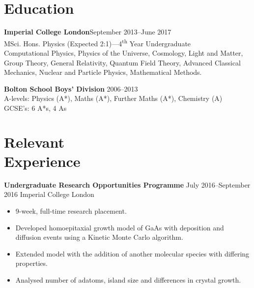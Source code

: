 \documentclass[12pt, margin]{res}
\begin{document}
 

 
\address{{\bf Present Address} \\ 119 Latymer Court \\ Hammersmith Road \\ London, W6 7JF}
\address{{\bf Permanent Address} \\ 174 Crompton Way \\ Bolton, BL2 2SA \\}

 
\begin{resume} 
 

\section{Education}
{\bf Imperial College London}\hfill September 2013--June 2017\\
MSci. Hons. Physics (Expected 2:1)---4\textsuperscript{th} Year Undergraduate\\
Computational Physics, Physics of the Universe, Cosmology, Light and Matter,  Group Theory, General Relativity, Quantum Field Theory, Advanced Classical Mechanics, Nuclear and Particle Physics, Mathematical Methods.

{\bf Bolton School Boys' Division} \hfill 2006--2013 \\
A-levels: Physics (A*), Maths (A*), Further Maths (A*), Chemistry (A)\\
GCSE's: 6 A*s, 4 As
 

\section{Relevant\\ Experience}

 {\bf Undergraduate Research Opportunities Programme} \hfill July 2016--September 2016 \hfill  Imperial College London
 \begin{itemize} \itemsep -2pt  %
\item 9-week, full-time research placement.
 \item Developed homoepitaxial growth model of GaAs with deposition and diffusion events using a Kinetic Monte Carlo algorithm.
\item Extended model with the addition of another molecular species with differing properties. 
\item Analysed number of adatoms, island size and differences in crystal growth.
\end{itemize}



\end{resume}
\end{document}
